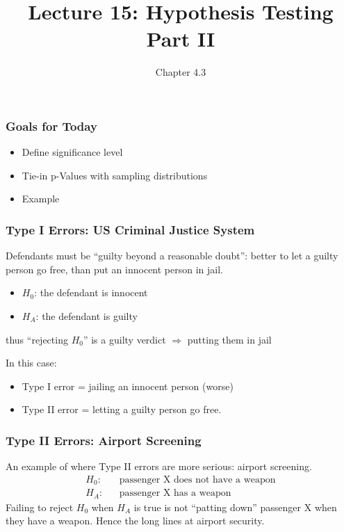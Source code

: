 \documentclass[handout]{beamer}
\title{Lecture 15: Hypothesis Testing Part II}
\author{Chapter 4.3}
\date{}
\newcommand{\blue}[1]{\textcolor{blue2}{#1}}
\begin{document}
\begin{frame}
\titlepage
\end{frame}


\begin{frame}[fragile]
\frametitle{Goals for Today}

\begin{itemize}
\item Define significance level
\item Tie-in p-Values with sampling distributions
\item Example
\end{itemize}

\end{frame}


\begin{frame}
\frametitle{Type I Errors:  US Criminal Justice System}
Defendants must be ``guilty beyond a reasonable doubt'': better to let a guilty person go free, than put an innocent person in jail.  

\pause\vskip 0.25cm

\begin{itemize}
\item $H_0$: the defendant is innocent
\item $H_A$: the defendant is guilty
\end{itemize}
\pause thus ``rejecting $H_0$'' is a guilty verdict $\Rightarrow$ putting them in jail

\vskip 0.25cm

\pause In this case:
\begin{itemize}
\item Type I error = jailing an innocent person (worse)
\item Type II error = letting a guilty person go free.  
\end{itemize}
\end{frame}


\begin{frame}
\frametitle{Type II Errors: Airport Screening}
An example of where Type II errors are more serious:  \blue{airport screening}. 
\pause \begin{eqnarray*}
H_0: && \mbox{passenger X does not have a weapon}\\
H_A: && \mbox{passenger X has a weapon}
\end{eqnarray*}
\pause Failing to reject $H_0$ when $H_A$ is true is not ``patting down'' passenger X when they have a weapon.
\vskip 0.25cm
\pause Hence the long lines at airport security.  
\end{frame}
\end{document}
